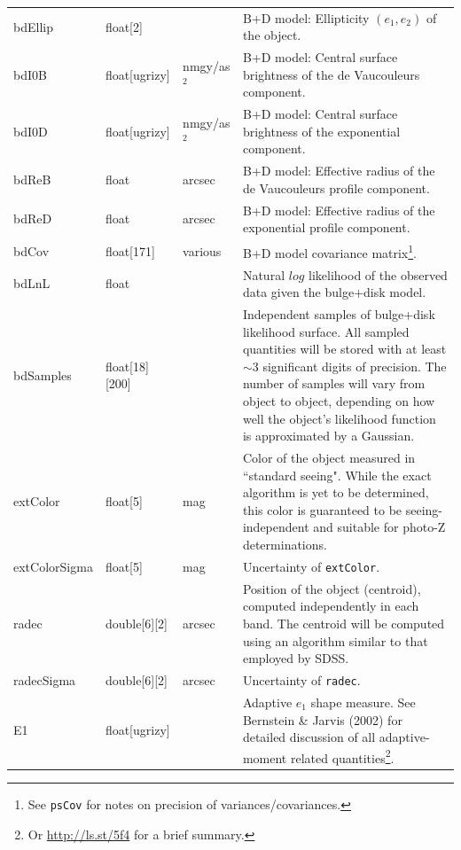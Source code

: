 \documentclass[12pt]{article}
\begin{document}
\begin{center}
\begin{longtable}{p{3cm}p{2cm}p{2cm}p{5cm}}
bdEllip & float[2] & ~ & B+D model: Ellipticity $(e_1, e_2)$ of the object. \\

bdI0B & float[ugrizy] & nmgy/as$^2$ & B+D model: Central surface brightness of the de Vaucouleurs component. \\

bdI0D & float[ugrizy] & nmgy/as$^2$ & B+D model: Central surface brightness of the exponential component. \\

bdReB & float & arcsec & B+D model: Effective radius of the de Vaucouleurs profile component. \\

bdReD & float & arcsec & B+D model: Effective radius of the exponential profile component. \\

bdCov & float[171] & various & B+D model covariance matrix\footnote{See {\tt psCov} for notes on precision of variances/covariances.}. \\ 

bdLnL & float & ~ & Natural $log$ likelihood of the observed data given the bulge+disk model. \\ 

bdSamples & float[18][200] & ~ & Independent samples of bulge+disk likelihood surface. All sampled quantities will be stored with at least $\sim 3$ significant digits of precision. The number of samples will vary from object to object, depending on how well the object's likelihood function is approximated by a Gaussian.\\

extColor & float[5] & mag & Color of the object measured in ``standard seeing". While the exact algorithm is yet to be determined, this color is guaranteed to be seeing-independent and suitable for photo-Z determinations.\\

extColorSigma & float[5] & mag & Uncertainty of {\tt extColor}. \\

radec & double[6][2] & arcsec & Position of the object (centroid), computed independently in each band. The centroid will be computed using an algorithm similar to that employed by SDSS.\\

radecSigma & double[6][2] & arcsec & Uncertainty of {\tt radec}. \\


E1 & float[ugrizy] & ~ & Adaptive $e_1$ shape measure. See Bernstein \& Jarvis (2002) for detailed discussion of all adaptive-moment related quantities\footnote{Or \url{http://ls.st/5f4} for a brief summary.}. \\


\end{longtable}
\end{center}
\end{document}
